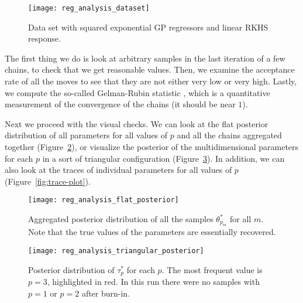 \begin{figure}[ht!]
  \centering
  \texttt{[image: reg\_analysis\_dataset]}
  \caption{Data set with squared exponential GP regressors and linear RKHS response.}\label{fig:dataset-linear}
\end{figure}

The first thing we do is look at arbitrary samples in the last iteration of a few chains, to check that we get reasonable values. Then, we examine the acceptance rate of all the moves to see that they are not either very low or very high. Lastly, we compute the so-called Gelman-Rubin statistic \citep{gelman1992inference}, which is a quantitative measurement of the convergence of the chains (it should be near \(1\)).

Next we proceed with the visual checks. We can look at the flat posterior distribution of all parameters for all values of \(p\) and all the chains aggregated together (Figure~\ref{fig:flat-posterior-linear}), or visualize the posterior of the multidimensional parameters for each \(p\) in a sort of triangular configuration (Figure~\ref{fig:triangular-posterior-linear}). In addition, we can also look at the traces of individual parameters for all values of \(p\) (Figure~\ref{fig:trace-plot}).

\begin{figure}[ht!]
  \centering
  \texttt{[image: reg\_analysis\_flat\_posterior]}
  \caption{Aggregated posterior distribution of all the samples \(\theta^*_{p_m}\) for all \(m\). Note that the true values of the parameters are essentially recovered.}\label{fig:flat-posterior-linear}
\end{figure}

\begin{figure}[ht!]
  \centering
  \texttt{[image: reg\_analysis\_triangular\_posterior]}
  \caption{Posterior distribution of \(\tau_p^*\) for each \(p\). The most frequent value is \(p=3\), highlighted in red. In this run there were no samples with \(p=1\) or \(p=2\) after burn-in.}\label{fig:triangular-posterior-linear}
  \end{figure}
  
